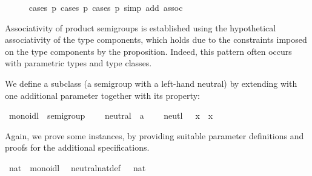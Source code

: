 \begin{isabellebody}
\ \ \ \ \isamarkupfalse%
\ {\isacharparenleft}cases\ p\ cases\ p\ cases\ p\ {\isacharparenleft}simp\ add{\isacharcolon}\ assoc{\isacharparenright}%
\begin{isamarkuptxt}%
\noindent Associativity of product semigroups is established
using the hypothetical associativity \hyperlink{fact.assoc}{\mbox{}} of the type
components, which holds due to the  constraints
imposed on the type components by the \hyperlink{command.instance}{\mbox{}} proposition.
Indeed, this pattern often occurs with parametric types and type
classes.%
\end{isamarkuptxt}%
\isamarkuptrue%
\isamarkupfalse%
%
\endisatagproof
{\isafoldproof}%
%
\isadelimproof
%
\endisadelimproof
\isanewline
\isanewline
{}\isamarkupfalse%
%
\isamarkuptrue%
%
\begin{isamarkuptext}%
We define a subclass  (a semigroup with a
left-hand neutral) by extending  with one additional
parameter  together with its property:%
\end{isamarkuptext}%
\isamarkuptrue%
\isamarkupfalse%
\ monoidl\ {\isacharequal}\ semigroup\ {\isacharplus}\isanewline
\ \ \ neutral\ {\isacharcolon}{\isacharcolon}\ {\isachardoublequoteopen}{\isacharprime}a{\isachardoublequoteclose}\ {\isacharparenleft}{\isachardoublequoteopen}{\isasymzero}{\isachardoublequoteclose}{\isacharparenright}\isanewline
\ \ \ neutl{\isacharcolon}\ {\isachardoublequoteopen}{\isasymzero}\ {\isasymoplus}\ x\ {\isacharequal}\ x{\isachardoublequoteclose}%
\begin{isamarkuptext}%
\noindent Again, we prove some instances, by providing
suitable parameter definitions and proofs for the additional
specifications.%
\end{isamarkuptext}%
\isamarkuptrue%
\isamarkupfalse%
\ nat\ {\isacharcolon}{\isacharcolon}\ monoidl\isanewline
{}\isanewline
\isanewline
{}\isamarkupfalse%
\isanewline
\ \ neutral{\isacharunderscore}nat{\isacharunderscore}def{\isacharcolon}\ {\isachardoublequoteopen}{\isasymzero}\ {\isacharequal}\ {\isacharparenleft}{}{\isasymColon}nat{\isacharparenright}{\isachardoublequoteclose}\isanewline
\isanewline
{}\isamarkupfalse%

\end{isabellebody}
